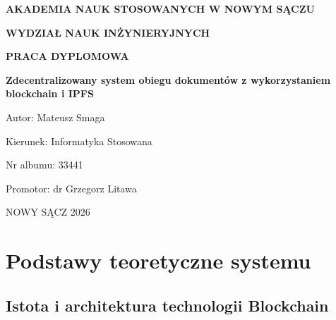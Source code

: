 \documentclass[12pt,a4paper,twoside]{report}
\begin{document}
\begin{titlepage}
    \centering
    \vspace*{2cm}
    {\fontsize{18}{22}\selectfont \textbf{AKADEMIA NAUK STOSOWANYCH W NOWYM SĄCZU}\par}
    \vspace{1cm}
    {\fontsize{18}{22}\selectfont \textbf{WYDZIAŁ NAUK INŻYNIERYJNYCH}\par}
    \vspace{2cm}
    {\fontsize{16}{20}\selectfont \textbf{PRACA DYPLOMOWA}\par}
    \vspace{1.5cm}
    {\fontsize{16}{20}\selectfont \textbf{Zdecentralizowany system obiegu dokumentów z wykorzystaniem blockchain i IPFS}\par}
    \vspace{2cm}
    \begin{flushright}
        {\fontsize{14}{18}\selectfont Autor: Mateusz Smaga\par}
        \vspace{0.3cm}
        {\fontsize{12}{15}\selectfont Kierunek: Informatyka Stosowana\par}
        \vspace{0.3cm}
        {\fontsize{12}{15}\selectfont Nr albumu: 33441\par}
    \end{flushright}
    \vspace{2cm}
    {\fontsize{12}{15}\selectfont Promotor: dr Grzegorz Litawa\par}
    \vspace{1cm}
    {\fontsize{12}{15}\selectfont NOWY SĄCZ 2026\par}
\end{titlepage}

\pagestyle{plain}
\tableofcontents
\clearpage

\pagestyle{main}


\chapter{Podstawy teoretyczne systemu}

\section{Istota i architektura technologii Blockchain}
\end{document}
